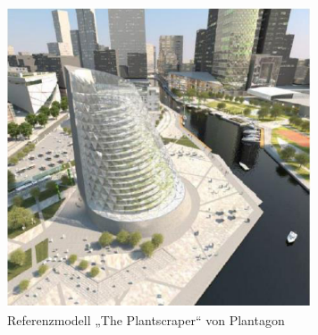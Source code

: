 \documentclass{scrartcl}
\begin{document}
\begin{figure}[htbp]
    \centering
    \includegraphics[width=9cm]{image_folder/plantscraper.png}
  \caption{Referenzmodell „The Plantscraper“ von Plantagon}
  \label{fig:plantagon_2}
\end{figure} 







\end{document}
